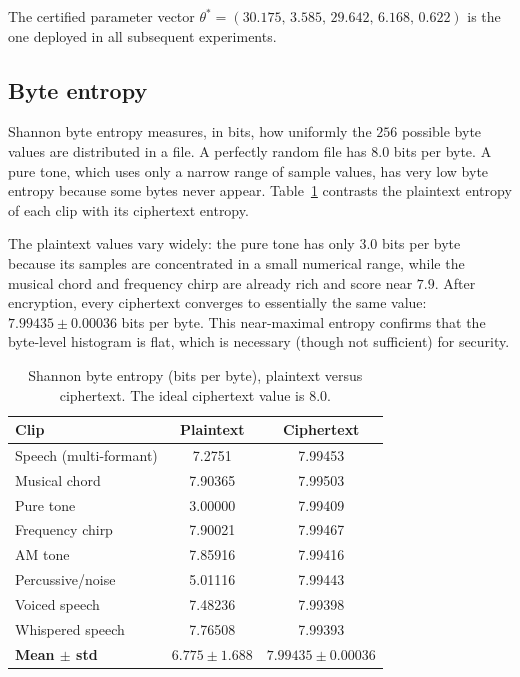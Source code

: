 \documentclass[pdflatex,sn-mathphys-num]{sn-jnl}%
\theoremstyle{thmstyleone}%
\theoremstyle{thmstyletwo}%
\theoremstyle{thmstylethree}%
\begin{document}
The certified parameter vector $\theta^\ast=(30.175,\,3.585,\,29.642,\,6.168,\,0.622)$ is the one deployed in all subsequent experiments.

\subsection{Byte entropy}
\label{sec:entropy}

Shannon byte entropy measures, in bits, how uniformly the $256$ possible byte values are distributed in a file. A perfectly random file has $8.0$ bits per byte. A pure tone, which uses only a narrow range of sample values, has very low byte entropy because some bytes never appear. Table~\ref{tab:entropy} contrasts the plaintext entropy of each clip with its ciphertext entropy.

The plaintext values vary widely: the pure tone has only $3.0$ bits per byte because its samples are concentrated in a small numerical range, while the musical chord and frequency chirp are already rich and score near $7.9$. After encryption, every ciphertext converges to essentially the same value: $7.99435\pm0.00036$ bits per byte. This near-maximal entropy confirms that the byte-level histogram is flat, which is necessary (though not sufficient) for security.

\begin{table}[htbp]
\centering
\caption{Shannon byte entropy (bits per byte), plaintext versus ciphertext. The ideal ciphertext value is $8.0$.}
\label{tab:entropy}
\small
\begin{tabular}{lcc}
\toprule
\textbf{Clip} & \textbf{Plaintext} & \textbf{Ciphertext} \\
\midrule
Speech (multi-formant) & 7.2751 & 7.99453 \\
Musical chord & 7.90365 & 7.99503 \\
Pure tone & 3.00000 & 7.99409 \\
Frequency chirp & 7.90021 & 7.99467 \\
AM tone & 7.85916 & 7.99416 \\
Percussive/noise & 5.01116 & 7.99443 \\
Voiced speech & 7.48236 & 7.99398 \\
Whispered speech & 7.76508 & 7.99393 \\
\midrule
\textbf{Mean $\pm$ std} & $6.775 \pm 1.688$ & $7.99435 \pm 0.00036$ \\
\bottomrule
\end{tabular}
\end{table}
\end{document}
